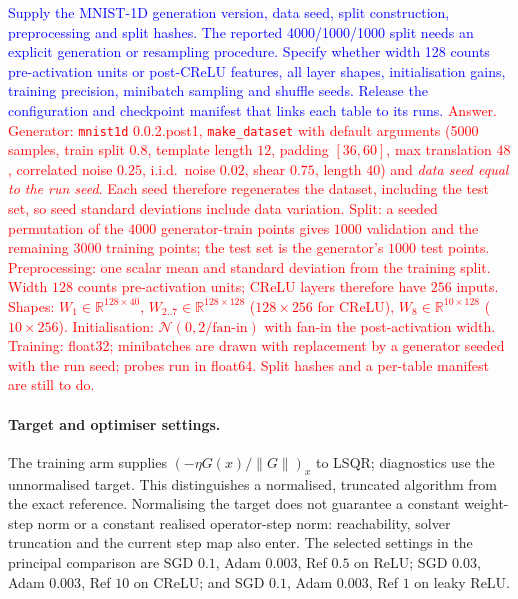 \documentclass{article}
\newcommand{\zied}[1]{\textcolor{blue}{#1}}
\newcommand{\nat}[1]{\textcolor{red}{#1}}
\newcommand{\R}{\mathbb{R}}
\theoremstyle{definition}
\theoremstyle{remark}
\begin{document}
\zied{Supply the MNIST-1D generation version, data seed, split construction, preprocessing and split hashes. The reported 4000/1000/1000 split needs an explicit generation or resampling procedure. Specify whether width 128 counts pre-activation units or post-CReLU features, all layer shapes, initialisation gains, training precision, minibatch sampling and shuffle seeds. Release the configuration and checkpoint manifest that links each table to its runs.}
\nat{Answer. Generator: \texttt{mnist1d} 0.0.2.post1, \texttt{make\_dataset} with default arguments (5000 samples, train split $0.8$, template length $12$, padding $[36,60]$, max translation $48$, correlated noise $0.25$, i.i.d.\ noise $0.02$, shear $0.75$, length $40$) and \emph{data seed equal to the run seed}. Each seed therefore regenerates the dataset, including the test set, so seed standard deviations include data variation. Split: a seeded permutation of the $4000$ generator-train points gives $1000$ validation and the remaining $3000$ training points; the test set is the generator's $1000$ test points. Preprocessing: one scalar mean and standard deviation from the training split. Width $128$ counts pre-activation units; CReLU layers therefore have $256$ inputs. Shapes: $W_1\in\R^{128\times40}$, $W_{2..7}\in\R^{128\times128}$ ($128\times256$ for CReLU), $W_8\in\R^{10\times128}$ ($10\times256$). Initialisation: $\mathcal N(0,2/\text{fan-in})$ with fan-in the post-activation width. Training: float32; minibatches are drawn with replacement by a generator seeded with the run seed; probes run in float64. Split hashes and a per-table manifest are still to do.}

\paragraph{Target and optimiser settings.}
The training arm supplies $(-\eta G(x)/\|G\|)_x$ to LSQR; diagnostics use the unnormalised target. This distinguishes a normalised, truncated algorithm from the exact reference. Normalising the target does not guarantee a constant weight-step norm or a constant realised operator-step norm: reachability, solver truncation and the current step map also enter. The selected settings in the principal comparison are SGD $0.1$, Adam $0.003$, Ref $0.5$ on ReLU; SGD $0.03$, Adam $0.003$, Ref $10$ on CReLU; and SGD $0.1$, Adam $0.003$, Ref $1$ on leaky ReLU.
\end{document}
